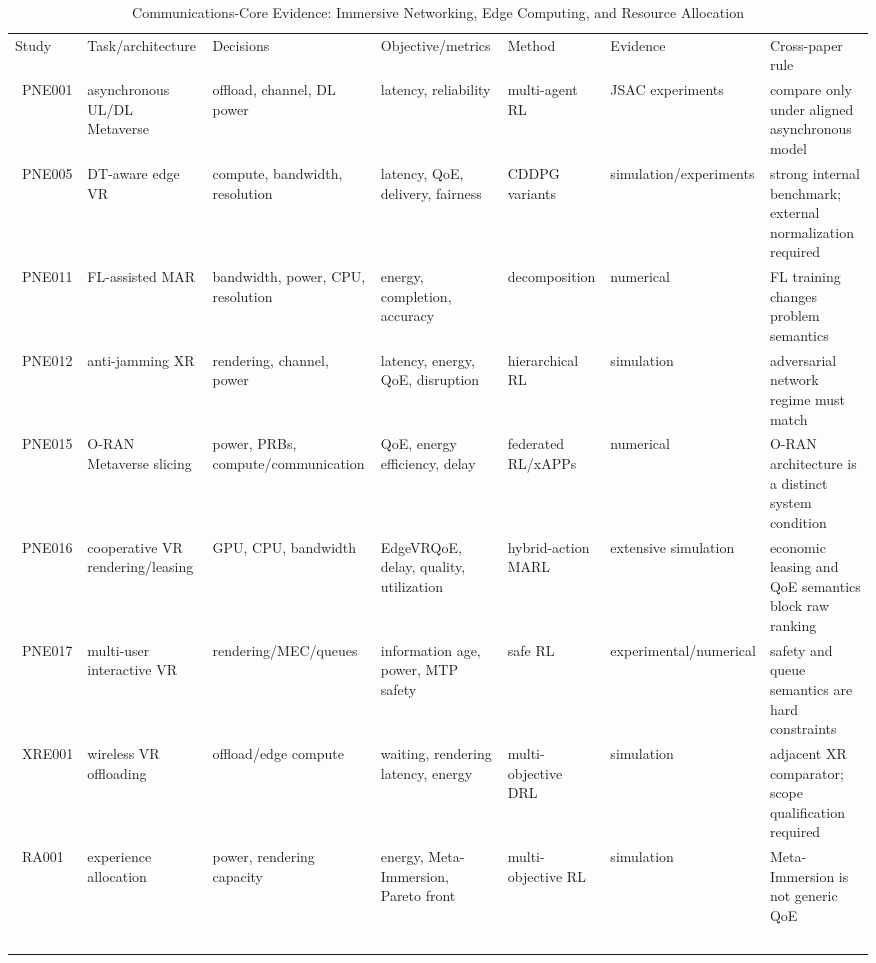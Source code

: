 \begin{table}[!t]\centering\caption{Communications-Core Evidence: Immersive Networking, Edge Computing, and Resource Allocation}\label{tab:networkcore}\scriptsize\begin{tabularx}{\textwidth}{p{}p{}p{}p{}p{}p{}Y}\toprule Study & Task/architecture & Decisions & Objective/metrics & Method & Evidence & Cross-paper rule \\\ \midrule PNE001 & asynchronous UL/DL Metaverse & offload, channel, DL power & latency, reliability & multi-agent RL & JSAC experiments & compare only under aligned asynchronous model \\\ PNE005 & DT-aware edge VR & compute, bandwidth, resolution & latency, QoE, delivery, fairness & CDDPG variants & simulation/experiments & strong internal benchmark; external normalization required \\\ PNE011 & FL-assisted MAR & bandwidth, power, CPU, resolution & energy, completion, accuracy & decomposition & numerical & FL training changes problem semantics \\\ PNE012 & anti-jamming XR & rendering, channel, power & latency, energy, QoE, disruption & hierarchical RL & simulation & adversarial network regime must match \\\ PNE015 & O-RAN Metaverse slicing & power, PRBs, compute/communication & QoE, energy efficiency, delay & federated RL/xAPPs & numerical & O-RAN architecture is a distinct system condition \\\ PNE016 & cooperative VR rendering/leasing & GPU, CPU, bandwidth & EdgeVRQoE, delay, quality, utilization & hybrid-action MARL & extensive simulation & economic leasing and QoE semantics block raw ranking \\\ PNE017 & multi-user interactive VR & rendering/MEC/queues & information age, power, MTP safety & safe RL & experimental/numerical & safety and queue semantics are hard constraints \\\ XRE001 & wireless VR offloading & offload/edge compute & waiting, rendering latency, energy & multi-objective DRL & simulation & adjacent XR comparator; scope qualification required \\\ RA001 & experience allocation & power, rendering capacity & energy, Meta-Immersion, Pareto front & multi-objective RL & simulation & Meta-Immersion is not generic QoE \\\ \bottomrule\end{tabularx}\end{table}